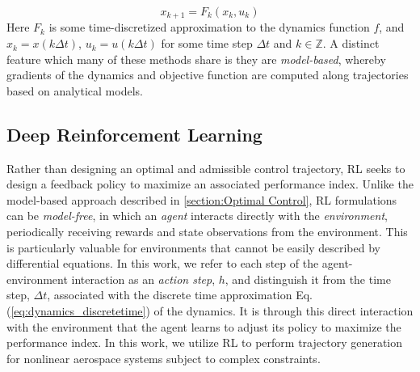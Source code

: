 \documentclass{UnderReview}
\begin{document}
\begin{equation} \label{eq:dynamics_discretetime}
	x_{k+1} = F_k(x_k,u_k)
\end{equation}
Here $F_k$ is some time-discretized approximation to the dynamics function $f$, and $x_k=x(k\Delta t)$, $u_k=u(k\Delta t)$ for some time step $\Delta t$ and $k\in \mathbb{Z}$. A distinct feature which many of these methods share is they are \textit{model-based}, whereby gradients of the dynamics and objective function are computed along trajectories based on analytical models.


\subsection{Deep Reinforcement Learning}\label{section: deep rl}
Rather than designing an optimal and admissible control trajectory, RL \cite{sutton2018reinforcement} seeks to design a feedback policy to maximize an associated performance index.  Unlike the model-based approach described in \ref{section:Optimal Control}, RL formulations can be \textit{model-free}, in which an \textit{agent} interacts directly with the \textit{environment}, periodically receiving rewards and state observations from the environment.  This is particularly valuable for environments that cannot be easily described by differential equations.  In this work, we refer to each step of the agent-environment interaction as an \textit{action step}, $h$, and distinguish it from the time step, $\Delta t$, associated with the discrete time approximation Eq. (\ref{eq:dynamics_discretetime}) of the dynamics.  It is through this direct interaction with the environment that the agent learns to adjust its policy to maximize the performance index.  In this work, we utilize RL to perform trajectory generation for nonlinear aerospace systems subject to complex constraints.
\end{document}
